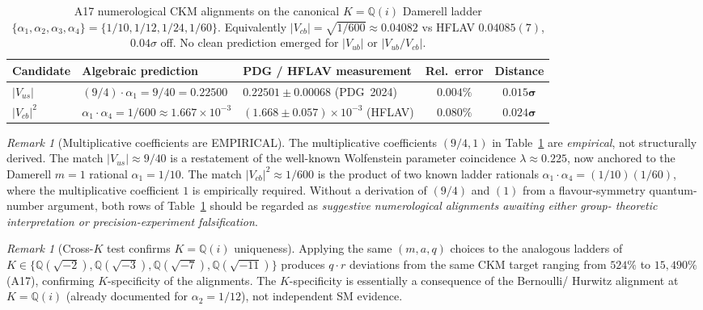 \documentclass[a4paper,11pt]{article}
\newcommand{\Qi}{\mathbb{Q}(i)}
\theoremstyle{definition}
\theoremstyle{remark}
\newtheorem{remark}[theorem]{Remark}
\begin{document}
\begin{table}[ht]
\centering
\begin{tabular}{lllcc}
\toprule
Candidate & Algebraic prediction & PDG / HFLAV measurement &
Rel.\ error & Distance \\
\midrule
$|V_{us}|$ &
$(9/4)\cdot\alpha_1 = 9/40 = 0.22500$ &
$0.22501\pm 0.00068$ (PDG~2024) &
$0.004\%$ & $\bm{0.015\sigma}$ \\
$|V_{cb}|^{2}$ &
$\alpha_1\cdot\alpha_4 = 1/600 \approx 1.667\times 10^{-3}$ &
$(1.668\pm 0.057)\times 10^{-3}$ (HFLAV) &
$0.080\%$ & $\bm{0.024\sigma}$ \\
\bottomrule
\end{tabular}
\caption{A17 numerological CKM alignments on the canonical $K=\Qi$
Damerell ladder $\{\alpha_1,\alpha_2,\alpha_3,\alpha_4\}=
\{1/10,1/12,1/24,1/60\}$.  Equivalently $|V_{cb}|=\sqrt{1/600}\approx
0.04082$ vs HFLAV $0.04085(7)$, $0.04\sigma$ off.  No clean prediction
emerged for $|V_{ub}|$ or $|V_{ub}/V_{cb}|$.}
\label{tab:CKM}
\end{table}

\begin{remark}[Multiplicative coefficients are EMPIRICAL]
\label{rem:CKMcaveat}
The multiplicative coefficients $(9/4,1)$ in
Table~\ref{tab:CKM} are \emph{empirical}, not structurally derived.
The match $|V_{us}|\approx 9/40$ is a restatement of the well-known
Wolfenstein parameter coincidence $\lambda\approx 0.225$, now anchored
to the Damerell $m=1$ rational $\alpha_1=1/10$.  The match
$|V_{cb}|^2\approx 1/600$ is the product of two known ladder rationals
$\alpha_1\cdot\alpha_4=(1/10)(1/60)$, where the multiplicative
coefficient $1$ is empirically required.  Without a derivation of
$(9/4)$ and $(1)$ from a flavour-symmetry quantum-number argument,
both rows of Table~\ref{tab:CKM} should be regarded as
\emph{suggestive numerological alignments awaiting either group-
theoretic interpretation or precision-experiment falsification}.
\end{remark}

\begin{remark}[Cross-$K$ test confirms $K=\Qi$ uniqueness]
Applying the same $(m,a,q)$ choices to the analogous ladders of
$K\in\{\mathbb{Q}(\sqrt{-2}),\mathbb{Q}(\sqrt{-3}),
\mathbb{Q}(\sqrt{-7}),\mathbb{Q}(\sqrt{-11})\}$ produces $q\cdot r$
deviations from the same CKM target ranging from $524\%$ to
$15{,}490\%$ (A17), confirming $K$-specificity of the alignments.
The $K$-specificity is essentially a consequence of the Bernoulli/
Hurwitz alignment at $K=\Qi$ (already documented for $\alpha_2=1/12$),
not independent SM evidence.
\end{remark}
\end{document}
